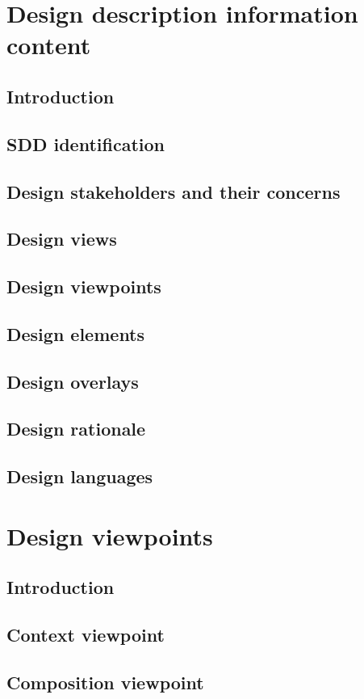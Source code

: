 \documentclass[compsoc,draftclsnofoot,onecolumn,10pt]{IEEEtran}
\begin{document}
\section{Design description information content} 
\subsection{Introduction}
\subsection{SDD identification}
\subsection{Design stakeholders and their concerns} 
\subsection{Design views}
\subsection{Design viewpoints} 
\subsection{Design elements} 
\subsection{Design overlays}
\subsection{Design rationale}
\subsection{Design languages}

\section{Design viewpoints}
\subsection{Introduction} 
\subsection{Context viewpoint} 
\subsection{Composition viewpoint} 
\end{document}
